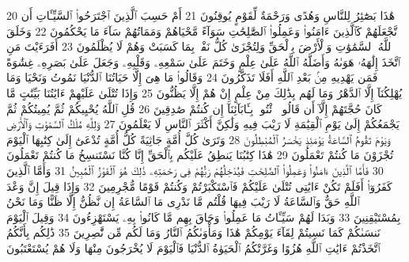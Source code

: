 {\tiny\colorbox{cl_aya}{20}} هَٰذَا بَصَٰٓئِرُ لِلنَّاسِ وَهُدًى وَرَحْمَةٌ لِّقَوْمٍ يُوقِنُونَ
{\tiny\colorbox{cl_aya}{21}} أَمْ حَسِبَ ٱلَّذِينَ ٱجْتَرَحُوا۟ ٱلسَّيِّـَٔاتِ أَن نَّجْعَلَهُمْ كَٱلَّذِينَ ءَامَنُوا۟ وَعَمِلُوا۟ ٱلصَّٰلِحَٰتِ سَوَآءً مَّحْيَاهُمْ وَمَمَاتُهُمْ سَآءَ مَا يَحْكُمُونَ
{\tiny\colorbox{cl_aya}{22}} وَخَلَقَ ٱللَّهُ ٱلسَّمَٰوَٰتِ وَٱلْأَرْضَ بِٱلْحَقِّ وَلِتُجْزَىٰ كُلُّ نَفْسٍۭ بِمَا كَسَبَتْ وَهُمْ لَا يُظْلَمُونَ
{\tiny\colorbox{cl_aya}{23}} أَفَرَءَيْتَ مَنِ ٱتَّخَذَ إِلَٰهَهُۥ هَوَىٰهُ وَأَضَلَّهُ ٱللَّهُ عَلَىٰ عِلْمٍ وَخَتَمَ عَلَىٰ سَمْعِهِۦ وَقَلْبِهِۦ وَجَعَلَ عَلَىٰ بَصَرِهِۦ غِشَٰوَةً فَمَن يَهْدِيهِ مِنۢ بَعْدِ ٱللَّهِ أَفَلَا تَذَكَّرُونَ
{\tiny\colorbox{cl_aya}{24}} وَقَالُوا۟ مَا هِىَ إِلَّا حَيَاتُنَا ٱلدُّنْيَا نَمُوتُ وَنَحْيَا وَمَا يُهْلِكُنَآ إِلَّا ٱلدَّهْرُ وَمَا لَهُم بِذَٰلِكَ مِنْ عِلْمٍ إِنْ هُمْ إِلَّا يَظُنُّونَ
{\tiny\colorbox{cl_aya}{25}} وَإِذَا تُتْلَىٰ عَلَيْهِمْ ءَايَٰتُنَا بَيِّنَٰتٍ مَّا كَانَ حُجَّتَهُمْ إِلَّآ أَن قَالُوا۟ ٱئْتُوا۟ بِـَٔابَآئِنَآ إِن كُنتُمْ صَٰدِقِينَ
{\tiny\colorbox{cl_aya}{26}} قُلِ ٱللَّهُ يُحْيِيكُمْ ثُمَّ يُمِيتُكُمْ ثُمَّ يَجْمَعُكُمْ إِلَىٰ يَوْمِ ٱلْقِيَٰمَةِ لَا رَيْبَ فِيهِ وَلَٰكِنَّ أَكْثَرَ ٱلنَّاسِ لَا يَعْلَمُونَ
{\tiny\colorbox{cl_aya}{27}} وَلِلَّهِ مُلْكُ ٱلسَّمَٰوَٰتِ وَٱلْأَرْضِ وَيَوْمَ تَقُومُ ٱلسَّاعَةُ يَوْمَئِذٍ يَخْسَرُ ٱلْمُبْطِلُونَ
{\tiny\colorbox{cl_aya}{28}} وَتَرَىٰ كُلَّ أُمَّةٍ جَاثِيَةً كُلُّ أُمَّةٍ تُدْعَىٰٓ إِلَىٰ كِتَٰبِهَا ٱلْيَوْمَ تُجْزَوْنَ مَا كُنتُمْ تَعْمَلُونَ
{\tiny\colorbox{cl_aya}{29}} هَٰذَا كِتَٰبُنَا يَنطِقُ عَلَيْكُم بِٱلْحَقِّ إِنَّا كُنَّا نَسْتَنسِخُ مَا كُنتُمْ تَعْمَلُونَ
{\tiny\colorbox{cl_aya}{30}} فَأَمَّا ٱلَّذِينَ ءَامَنُوا۟ وَعَمِلُوا۟ ٱلصَّٰلِحَٰتِ فَيُدْخِلُهُمْ رَبُّهُمْ فِى رَحْمَتِهِۦ ذَٰلِكَ هُوَ ٱلْفَوْزُ ٱلْمُبِينُ
{\tiny\colorbox{cl_aya}{31}} وَأَمَّا ٱلَّذِينَ كَفَرُوٓا۟ أَفَلَمْ تَكُنْ ءَايَٰتِى تُتْلَىٰ عَلَيْكُمْ فَٱسْتَكْبَرْتُمْ وَكُنتُمْ قَوْمًا مُّجْرِمِينَ
{\tiny\colorbox{cl_aya}{32}} وَإِذَا قِيلَ إِنَّ وَعْدَ ٱللَّهِ حَقٌّ وَٱلسَّاعَةُ لَا رَيْبَ فِيهَا قُلْتُم مَّا نَدْرِى مَا ٱلسَّاعَةُ إِن نَّظُنُّ إِلَّا ظَنًّا وَمَا نَحْنُ بِمُسْتَيْقِنِينَ
{\tiny\colorbox{cl_aya}{33}} وَبَدَا لَهُمْ سَيِّـَٔاتُ مَا عَمِلُوا۟ وَحَاقَ بِهِم مَّا كَانُوا۟ بِهِۦ يَسْتَهْزِءُونَ
{\tiny\colorbox{cl_aya}{34}} وَقِيلَ ٱلْيَوْمَ نَنسَىٰكُمْ كَمَا نَسِيتُمْ لِقَآءَ يَوْمِكُمْ هَٰذَا وَمَأْوَىٰكُمُ ٱلنَّارُ وَمَا لَكُم مِّن نَّٰصِرِينَ
{\tiny\colorbox{cl_aya}{35}} ذَٰلِكُم بِأَنَّكُمُ ٱتَّخَذْتُمْ ءَايَٰتِ ٱللَّهِ هُزُوًا وَغَرَّتْكُمُ ٱلْحَيَوٰةُ ٱلدُّنْيَا فَٱلْيَوْمَ لَا يُخْرَجُونَ مِنْهَا وَلَا هُمْ يُسْتَعْتَبُونَ
